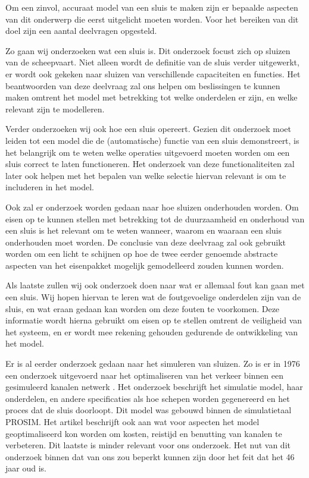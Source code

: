 \documentclass[../verslag.tex]{subfiles}
\begin{document}
Om een zinvol, accuraat model van een sluis te maken zijn er bepaalde aspecten van dit onderwerp die eerst uitgelicht moeten worden. Voor het bereiken van dit doel zijn een aantal deelvragen opgesteld.

Zo gaan wij onderzoeken wat een sluis is. Dit onderzoek focust zich op sluizen van de scheepvaart. Niet alleen wordt de definitie van de sluis verder uitgewerkt, er wordt ook gekeken naar sluizen van verschillende capaciteiten en functies. Het beantwoorden van deze deelvraag zal ons helpen om beslissingen te kunnen maken omtrent het model met betrekking tot welke onderdelen er zijn, en welke relevant zijn te modelleren.

Verder onderzoeken wij ook hoe een sluis opereert. Gezien dit onderzoek moet leiden tot een model die de (automatische) functie van een sluis demonstreert, is het belangrijk om te weten welke operaties uitgevoerd moeten worden om een sluis correct te laten functioneren. Het onderzoek van deze functionaliteiten zal later ook helpen met het bepalen van welke selectie hiervan relevant is om te includeren in het model.

Ook zal er onderzoek worden gedaan naar hoe sluizen onderhouden worden. Om eisen op te kunnen stellen met betrekking tot de duurzaamheid en onderhoud van een sluis is het relevant om te weten wanneer, waarom en waaraan een sluis onderhouden moet worden. De conclusie van deze deelvraag zal ook gebruikt worden om een licht te schijnen op hoe de twee eerder genoemde abstracte aspecten van het eisenpakket mogelijk gemodelleerd zouden kunnen worden.

Als laatste zullen wij ook onderzoek doen naar wat er allemaal fout kan gaan met een sluis. Wij hopen hiervan te leren wat de foutgevoelige onderdelen zijn van de sluis, en wat eraan gedaan kan worden om deze fouten te voorkomen. Deze informatie wordt hierna gebruikt om eisen op te stellen omtrent de veiligheid van het systeem, en er wordt mee rekening gehouden gedurende de ontwikkeling van het model.

Er is al eerder onderzoek gedaan naar het simuleren van sluizen. Zo is er in 1976 een onderzoek uitgevoerd naar het optimaliseren van het verkeer binnen een gesimuleerd kanalen netwerk \cite{oosterveld_1976}. Het onderzoek beschrijft het simulatie model, haar onderdelen, en andere specificaties als hoe schepen worden gegenereerd en het proces dat de sluis doorloopt. Dit model was gebouwd binnen de simulatietaal PROSIM. Het artikel beschrijft ook aan wat voor aspecten het model geoptimaliseerd kon worden om kosten, reistijd en benutting van kanalen te verbeteren. Dit laatste is minder relevant voor ons onderzoek. Het nut van dit onderzoek binnen dat van ons zou beperkt kunnen zijn door het feit dat het 46 jaar oud is.
\end{document}
